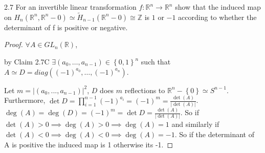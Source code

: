 \documentclass{article}
\newcommand{\R}{\mathbb{R}}
\newcommand{\Z}{\mathbb{Z}}
\newcommand{\abs}[1]{\left\lvert #1\right\rvert}
\begin{document}
\begin{PROB}{2.7}\label{Problem 2.7.}
    For an invertible linear transformation $f: \R^n \to \R^n$ show that the induced map on $H_n(\R^n,\R^n - {0}) \simeq \tilde H_{n-1}(\R^n - {0}) \cong \Z$ is $1$ or $-1$ according to whether the determinant of f is positive or negative.
\end{PROB}
\begin{proof}
    $\forall A \in GL_n(\R)$, 
    
    by Claim 2.7C $\exists (a_0, \dots, a_{n - 1}) \in \left\{ 0, 1 \right\}^n$ such that $A \simeq D = diag((-1)^{a_0}, \dots, (-1)^{a_n})$. 

    Let $m = |(a_0, ..., a_{n - 1})|^2$, $D$ does $m$ reflections to $\R^n - \left\{ 0 \right\} \simeq S^{n - 1}$. Furthermore, $\det D = \prod_{i = 1}^{n - 1} (-1)^{a_i} = (-1)^m = \frac{\det(A)}{\abs{\det(A)}}$. $\deg(A) = \deg(D) = (-1)^m = \det D = \frac{\det(A)}{\abs{\det(A)}}$. So if $\det(A) > 0 \implies \deg(A) >0 \implies \deg(A) = 1$ and similarly if $\det(A) < 0 \implies \deg(A) < 0 \implies \deg(A) = -1$. So if the determinant of A is positive the induced map is 1 otherwise its -1.           
\end{proof}

\bigskip
\end{document}
